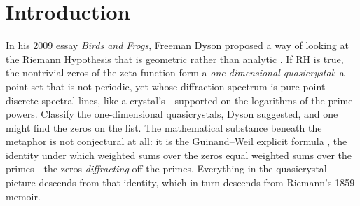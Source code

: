 \section{Introduction}
\label{sec:intro}

In his 2009 essay \emph{Birds and Frogs}, Freeman Dyson proposed a way of
looking at the Riemann Hypothesis that is geometric rather than analytic
\cite{dyson2009}. If RH is true, the nontrivial zeros of the zeta function form
a \emph{one-dimensional quasicrystal}: a point set that is not periodic, yet
whose diffraction spectrum is pure point---discrete spectral lines, like a
crystal's---supported on the logarithms of the prime powers. Classify the
one-dimensional quasicrystals, Dyson suggested, and one might find the zeros on
the list. The mathematical substance beneath the metaphor is not conjectural at
all: it is the Guinand--Weil explicit formula \cite{guinand1948,weil1952}, the
identity under which weighted sums over the zeros equal weighted sums over the
primes---the zeros \emph{diffracting} off the primes. Everything in the
quasicrystal picture descends from that identity, which in turn descends from
Riemann's 1859 memoir.

